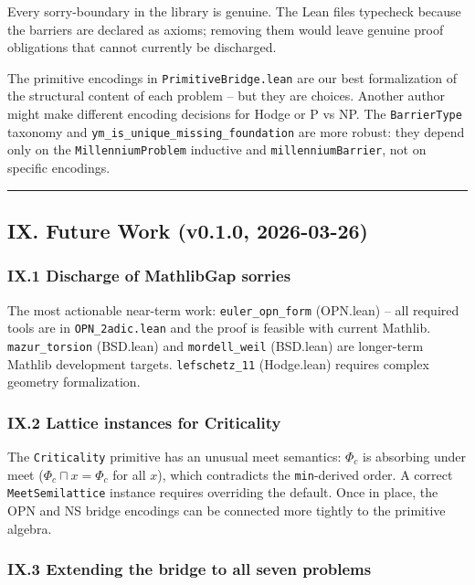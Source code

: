 \documentclass[12pt,a4paper]{article}
\begin{document}
Every sorry-boundary in the library is genuine. The Lean files typecheck because the barriers are declared as axioms; removing them would leave genuine proof obligations that cannot currently be discharged.

The primitive encodings in \texttt{PrimitiveBridge.lean} are our best formalization of the structural content of each problem  --  but they are choices. Another author might make different encoding decisions for Hodge or P vs NP. The \texttt{BarrierType} taxonomy and \texttt{ym\_is\_unique\_missing\_foundation} are more robust: they depend only on the \texttt{MillenniumProblem} inductive and \texttt{millenniumBarrier}, not on specific encodings.

\begin{center}
\rule{0.5\textwidth}{0.4pt}
\end{center}

\subsection{IX. Future Work (v0.1.0, 2026-03-26)}

\subsubsection{IX.1 Discharge of MathlibGap sorries}

The most actionable near-term work: \texttt{euler\_opn\_form} (OPN.lean)  --  all required tools are in \texttt{OPN\_2adic.lean} and the proof is feasible with current Mathlib. \texttt{mazur\_torsion} (BSD.lean) and \texttt{mordell\_weil} (BSD.lean) are longer-term Mathlib development targets. \texttt{lefschetz\_11} (Hodge.lean) requires complex geometry formalization.

\subsubsection{IX.2 Lattice instances for Criticality}

The \texttt{Criticality} primitive has an unusual meet semantics: $\Phi_c$ is absorbing under meet ($\Phi_c \sqcap x = \Phi_c$ for all $x$), which contradicts the \texttt{min}-derived order. A correct \texttt{MeetSemilattice} instance requires overriding the default. Once in place, the OPN and NS bridge encodings can be connected more tightly to the primitive algebra.

\subsubsection{IX.3 Extending the bridge to all seven problems}
\end{document}
